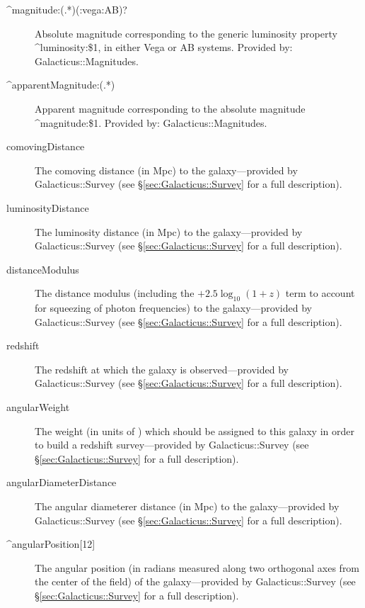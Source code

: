 \begin{description}
 \item[{\normalfont \ttfamily \textasciicircum magnitude:(.*)(:vega\textbar :AB)?}] Absolute magnitude corresponding to the generic luminosity property {\normalfont \ttfamily \textasciicircum luminosity:\$1}, in either Vega or AB systems. Provided by: {\normalfont \ttfamily Galacticus::Magnitudes}.
 \item[{\normalfont \ttfamily \textasciicircum apparentMagnitude:(.*)}] Apparent magnitude corresponding to the absolute magnitude {\normalfont \ttfamily \textasciicircum magnitude:\$1}. Provided by: {\normalfont \ttfamily Galacticus::Magnitudes}.
 \item[{\normalfont \ttfamily comovingDistance}] The comoving distance (in Mpc) to the galaxy---provided by {\normalfont \ttfamily Galacticus::Survey} (see \S\ref{sec:Galacticus::Survey} for a full description).
 \item[{\normalfont \ttfamily luminosityDistance}] The luminosity distance (in Mpc) to the galaxy---provided by {\normalfont \ttfamily Galacticus::Survey} (see \S\ref{sec:Galacticus::Survey} for a full description).
 \item[{\normalfont \ttfamily distanceModulus}] The distance modulus (including the $+2.5\log_{10}(1+z)$ term to account for squeezing of photon frequencies) to the galaxy---provided by {\normalfont \ttfamily Galacticus::Survey} (see \S\ref{sec:Galacticus::Survey} for a full description).
 \item[{\normalfont \ttfamily redshift}] The redshift at which the galaxy is observed---provided by {\normalfont \ttfamily Galacticus::Survey} (see \S\ref{sec:Galacticus::Survey} for a full description).
 \item[{\normalfont \ttfamily angularWeight}] The weight (in units of ) which should be assigned to this galaxy in order to build a redshift survey---provided by {\normalfont \ttfamily Galacticus::Survey} (see \S\ref{sec:Galacticus::Survey} for a full description).
 \item[{\normalfont \ttfamily angularDiameterDistance}] The angular diameterer distance (in Mpc) to the galaxy---provided by {\normalfont \ttfamily Galacticus::Survey} (see \S\ref{sec:Galacticus::Survey} for a full description).
 \item[{\normalfont \ttfamily \textasciicircum angularPosition[12]}] The angular position (in radians measured along two orthogonal axes from the center of the field) of the galaxy---provided by {\normalfont \ttfamily Galacticus::Survey} (see \S\ref{sec:Galacticus::Survey} for a full description).

\end{description}
